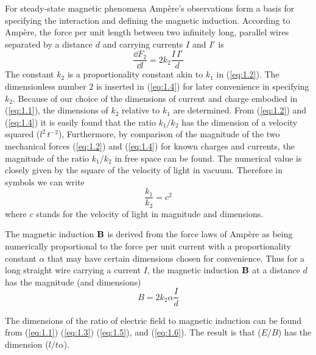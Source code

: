 For steady-state magnetic phenomena Ampère's observations form a basis for specifying the interaction and defining the magnetic induction. According to Ampère, the force per unit length between two infinitely long, parallel wires separated by a distance $d$ and carrying currents $I$ and $I'$ is
\begin{equation}\label{eq:1.4}
\frac{\dd{F_2}}{\dd{l}} = 2 k_2 \frac{I\,I'}{d}
\end{equation}
The constant $k_2$ is a proportionality constant akin to $k_1$ in (\ref{eq:1.2}). The dimensionless number $2$ is inserted in (\ref{eq:1.4}) for later convenience in specifying $k_2$. Because of our choice of the dimensions of current and charge embodied in (\ref{eq:1.1}), the dimensions of $k_2$ relative to $k_1$ are determined. From (\ref{eq:1.2}) and (\ref{eq:1.4}) it is easily found that the ratio $k_1/k_2$ 
has the dimension of a velocity squared ($l^2\,t^{-2}$), Furthermore, by comparison of the magnitude of the two mechanical forces (\ref{eq:1.2}) and (\ref{eq:1.4}) for known charges and currents, the magnitude of the ratio $k_1/k_2$ in free space can be found. The numerical value is closely given by the square of the velocity of light in vacuum. Therefore in symbols we can write
\begin{equation}\label{eq:1.5}
\frac{k_1}{k_2} = c^2
\end{equation}
where $c$ stands for the velocity of light in magnitude and dimensions.

The magnetic induction $\vb{B}$ is derived from the force laws of Ampère as being numerically proportional to the force per unit current with a proportionality constant $\alpha$ that may have certain dimensions chosen for convenience. Thus for a long straight wire carrying a current $I$, the magnetic induction $\vb{B}$ at a distance $d$ has the magnitude (and dimensions)
\begin{equation}\label{eq:1.6}
B = 2 k_2 \alpha \frac{I}{d}
\end{equation}

The dimensions of the ratio of electric field to magnetic induction can be found from (\ref{eq:1.1}) (\ref{eq:1.3}) (\ref{eq:1.5}), and (\ref{eq:1.6}). The result is that ($E/B$) has the dimension ($l/t\alpha$). 

